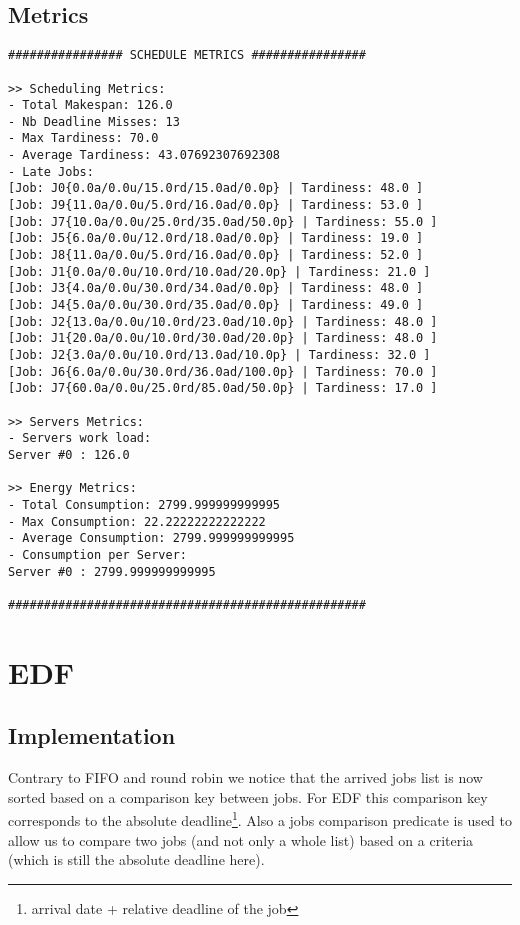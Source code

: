 \documentclass[./report.tex]{subfiles}
\begin{document}
\subsection{Metrics}
\begin{lstlisting}[style=txt, caption={Metrics for Round Robin on a single server}]
################ SCHEDULE METRICS ################

>> Scheduling Metrics: 
- Total Makespan: 126.0
- Nb Deadline Misses: 13
- Max Tardiness: 70.0
- Average Tardiness: 43.07692307692308
- Late Jobs: 
[Job: J0{0.0a/0.0u/15.0rd/15.0ad/0.0p} | Tardiness: 48.0 ]
[Job: J9{11.0a/0.0u/5.0rd/16.0ad/0.0p} | Tardiness: 53.0 ]
[Job: J7{10.0a/0.0u/25.0rd/35.0ad/50.0p} | Tardiness: 55.0 ]
[Job: J5{6.0a/0.0u/12.0rd/18.0ad/0.0p} | Tardiness: 19.0 ]
[Job: J8{11.0a/0.0u/5.0rd/16.0ad/0.0p} | Tardiness: 52.0 ]
[Job: J1{0.0a/0.0u/10.0rd/10.0ad/20.0p} | Tardiness: 21.0 ]
[Job: J3{4.0a/0.0u/30.0rd/34.0ad/0.0p} | Tardiness: 48.0 ]
[Job: J4{5.0a/0.0u/30.0rd/35.0ad/0.0p} | Tardiness: 49.0 ]
[Job: J2{13.0a/0.0u/10.0rd/23.0ad/10.0p} | Tardiness: 48.0 ]
[Job: J1{20.0a/0.0u/10.0rd/30.0ad/20.0p} | Tardiness: 48.0 ]
[Job: J2{3.0a/0.0u/10.0rd/13.0ad/10.0p} | Tardiness: 32.0 ]
[Job: J6{6.0a/0.0u/30.0rd/36.0ad/100.0p} | Tardiness: 70.0 ]
[Job: J7{60.0a/0.0u/25.0rd/85.0ad/50.0p} | Tardiness: 17.0 ]

>> Servers Metrics: 
- Servers work load:
Server #0 : 126.0

>> Energy Metrics: 
- Total Consumption: 2799.999999999995
- Max Consumption: 22.22222222222222
- Average Consumption: 2799.999999999995
- Consumption per Server: 
Server #0 : 2799.999999999995

##################################################
\end{lstlisting}


\newpage
\section{EDF}
\subsection{Implementation}
\label{subsec:edf}

Contrary to FIFO and round robin we notice that the arrived jobs list is now sorted based on a comparison key between jobs. For EDF this comparison key corresponds to the absolute deadline\footnote{arrival date + relative deadline of the job}. Also a jobs comparison predicate is used to allow us to compare two jobs (and not only a whole list) based on a criteria (which is still the absolute deadline here).
 
\end{document}
